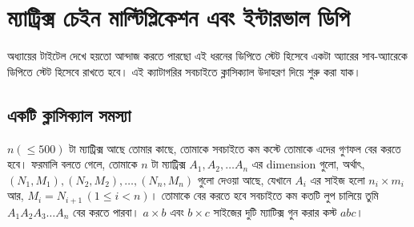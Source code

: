 \chapter{ম্যাট্রিক্স চেইন মাল্টিপ্লিকেশন এবং ইন্টারভাল ডিপি}

অধ্যায়ের টাইটেল দেখে হয়তো আন্দাজ করতে পারছো এই ধরনের ডিপিতে স্টেট হিসেবে একটা
অ্যারের সাব-অ্যারেকে ডিপিতে স্টেট হিসেবে রাখতে হবে। এই ক্যাটাগরির সবচাইতে
ক্লাসিক্যাল উদাহরণ দিয়ে শুরু করা যাক।

\section{একটি ক্লাসিক্যাল সমস্যা}

\begin{example}[ম্যাট্রিক্স চেইন মাল্টিপ্লিকেশন]
  $n (\le 500)$ টা ম্যাট্রিক্স আছে তোমার কাছে, তোমাকে সবচাইতে কম কস্টে তোমাকে
  এদের গুণফল বের করতে হবে। ফরমালি বলতে গেলে, তোমাকে $n$ টা ম্যাট্রিক্স $A_1,
  A_2,
  \ldots A_n$ এর dimension গুলো, অর্থাৎ, $(N_1, M_1), (N_2, M_2), \ldots,
  (N_n, M_n)$ গুলো দেওয়া আছে, যেখানে $A_i$ এর সাইজ হলো $n_i \times m_i$ আর,
  $M_i = N_{i+1} \, (1 \le i < n)$। তোমাকে বের করতে হবে সবচাইতে কম কতটি লুপ
  চালিয়ে তুমি $A_1 A_2 A_3 \dots A_n$ বের করতে পারবা। $a \times b$ এবং $b
  \times c$ সাইজের দুটি ম্যাটিক্স গুন করার কস্ট $abc$।
\end{example}

